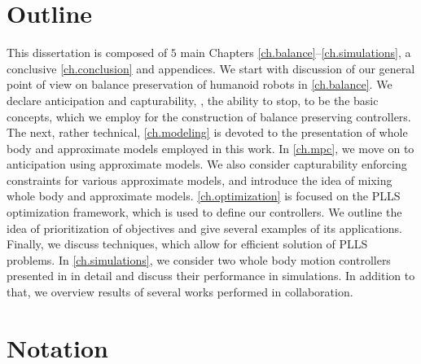 \section{Outline}
This dissertation is composed of $5$ main Chapters
\ref{ch.balance}--\ref{ch.simulations}, a conclusive \cref{ch.conclusion} and
appendices. We start with discussion of our general point of view on balance
preservation of humanoid robots in \cref{ch.balance}. We declare anticipation
and capturability, \IE, the ability to stop, to be the basic concepts, which we
employ for the construction of balance preserving controllers. The next, rather
technical, \cref{ch.modeling} is devoted to the presentation of whole body and
approximate models employed in this work. In \cref{ch.mpc}, we move on to
anticipation using approximate models. We also consider capturability enforcing
constraints for various approximate models, and introduce the idea of mixing
whole body and approximate models. \cref{ch.optimization} is focused on the
\acf{PLLS} optimization framework, which is used to define our controllers. We
outline the idea of prioritization of objectives and give several examples of
its applications. Finally, we discuss techniques, which allow for efficient
solution of \ac{PLLS} problems. In \cref{ch.simulations}, we consider two whole
body motion controllers presented in \cite{Sherikov2014humanoids,
Sherikov2015humanoids} in detail and discuss their performance in simulations.
In addition to that, we overview results of several works performed in
collaboration.


\section{Notation}\label{sec.notation}

